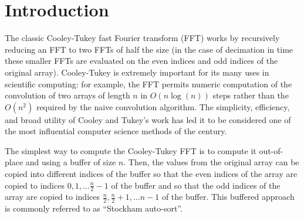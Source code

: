 \documentclass[10pt]{article}
\begin{document}
\section*{Introduction}
The classic Cooley-Tukey fast Fourier transform (FFT) works by
recursively reducing an FFT to two FFTs of half the size (in the case
of decimation in time these smaller FFTs are evaluated on the even
indices and odd indices of the original
array)\cite{cooley:algorithm}. Cooley-Tukey is extremely important for
its many uses in scientific computing: for example, the FFT permits
numeric computation of the convolution of two arrays of length $n$ in
$O(n \log(n))$ steps rather than the $O(n^2)$ required by the naive
convolution algorithm\cite{proakis:introduction}. The simplicity,
efficiency, and broad utility of Cooley and Tukey's work has led it to
be considered one of the most influential computer science methods of
the  century\cite{cipra:best}.

The simplest way to compute the Cooley-Tukey FFT is to compute it
out-of-place and using a buffer of size $n$. Then, the values from the
original array can be copied into different indices of the buffer so
that the even indices of the array are copied to indices $0, 1, \ldots
\frac{n}{2}-1$ of the buffer and so that the odd indices of the array
are copied to indices $\frac{n}{2}, \frac{n}{2}+1, \ldots n-1$ of the
buffer. This buffered approach is commonly referred to as ``Stockham
auto-sort''\cite{cochran:fast}.
\end{document}
